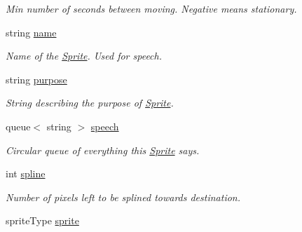\begin{DoxyCompactItemize}
\begin{DoxyCompactList}\small\item\em Min number of seconds between moving. Negative means stationary. \end{DoxyCompactList}\item 
string \hyperlink{class_sprite_a166409bbd17355e157618ec02441dab8}{name}\hypertarget{class_sprite_a166409bbd17355e157618ec02441dab8}{}\label{class_sprite_a166409bbd17355e157618ec02441dab8}

\begin{DoxyCompactList}\small\item\em Name of the \hyperlink{class_sprite}{Sprite}. Used for speech. \end{DoxyCompactList}\item 
string \hyperlink{class_sprite_ad23c15d2b97d15db7522f9caa1a0b7a2}{purpose}\hypertarget{class_sprite_ad23c15d2b97d15db7522f9caa1a0b7a2}{}\label{class_sprite_ad23c15d2b97d15db7522f9caa1a0b7a2}

\begin{DoxyCompactList}\small\item\em String describing the purpose of \hyperlink{class_sprite}{Sprite}. \end{DoxyCompactList}\item 
queue$<$ string $>$ \hyperlink{class_sprite_af7fbb50aaa8f3586b9a41def56384d43}{speech}\hypertarget{class_sprite_af7fbb50aaa8f3586b9a41def56384d43}{}\label{class_sprite_af7fbb50aaa8f3586b9a41def56384d43}

\begin{DoxyCompactList}\small\item\em Circular queue of everything this \hyperlink{class_sprite}{Sprite} says. \end{DoxyCompactList}\item 
int \hyperlink{class_sprite_aa3a18aaf97a12edfced1b31f2323ae01}{spline}\hypertarget{class_sprite_aa3a18aaf97a12edfced1b31f2323ae01}{}\label{class_sprite_aa3a18aaf97a12edfced1b31f2323ae01}

\begin{DoxyCompactList}\small\item\em Number of pixels left to be splined towards destination. \end{DoxyCompactList}\item 
sprite\+Type \hyperlink{class_sprite_afbd06de3c7cace1c741bbb609abfa119}{sprite}\hypertarget{class_sprite_afbd06de3c7cace1c741bbb609abfa119}{}\label{class_sprite_afbd06de3c7cace1c741bbb609abfa119}


\end{DoxyCompactItemize}
